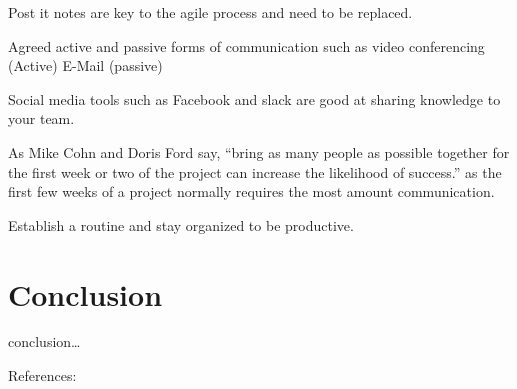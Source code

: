 \documentclass{scrartcl}
\begin{document}
Post it notes are key to the agile process and need to be replaced.

Agreed active and passive forms of communication such as video conferencing (Active) E-Mail (passive) \cite{joshi2013}

Social media tools such as Facebook and slack are good at sharing knowledge to your team.

As Mike Cohn and Doris Ford say, ``bring as many people as possible together for the first week or two of the project can increase the likelihood of success.'' \cite{cohn2003} as the first few weeks of a project normally requires the most amount communication.

Establish a routine and stay organized to be productive. \cite{Agile-on-the-beach-cite}

\section{Conclusion}

conclusion\ldots

References:
\cite{bhalerao2010}
\cite{scharff2012}
\cite{abdullah2011}
\cite{joshi2013}
\cite{krasteva2008}
\cite{williams2012}
\cite{marjaie2011}
\cite{kumar2015}
\cite{cohn2003} %



\end{document}
